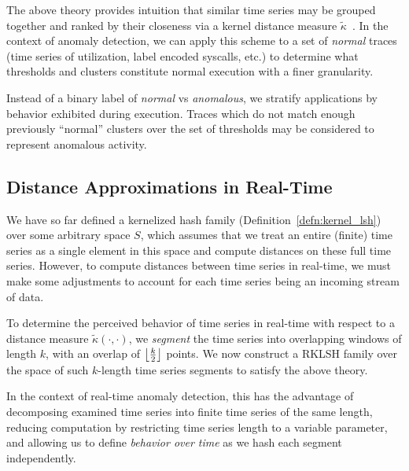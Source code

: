 \documentclass[a4paper]{article}
\theoremstyle{def}
\theoremstyle{thm}
\DeclarePairedDelimiter{\floor}{\lfloor}{\rfloor}
\begin{document}
The above theory provides intuition that similar time series may be grouped together and ranked by their closeness via a kernel distance measure $\tilde{\kappa}$~\cite{Hachiya13-NSH}.
In the context of anomaly detection, we can apply this scheme to a set of \textit{normal} traces (time series of utilization, label encoded syscalls, etc.) to determine what thresholds and clusters constitute normal execution with a finer granularity.

Instead of a binary label of \textit{normal} vs \textit{anomalous}, we stratify applications by behavior exhibited during execution.
Traces which do not match enough previously ``normal'' clusters over the set of thresholds may be considered to represent anomalous activity.

\subsection{Distance Approximations in Real-Time}
\label{subsec:time_series}

We have so far defined a kernelized hash family (Definition~\ref{defn:kernel_lsh}) over some arbitrary space $S$, which assumes that we treat an entire (finite) time series as a single element in this space and compute distances on these full time series.
However, to compute distances between time series in real-time, we must make some adjustments to account for each time series being an incoming stream of data.

To determine the perceived behavior of time series in real-time with respect to a distance measure $\tilde{\kappa}(\cdot,\cdot)$, we \textit{segment} the time series into overlapping windows of length $k$, with an overlap of $\floor[\big]{\frac{k}{2}}$ points.
We now construct a RKLSH family over the space of such $k$-length time series segments to satisfy the above theory.

In the context of real-time anomaly detection, this has the advantage of decomposing examined time series into finite time series of the same length, reducing computation by restricting time series length to a variable parameter, and allowing us to define \textit{behavior over time} as we hash each segment independently.
\end{document}
